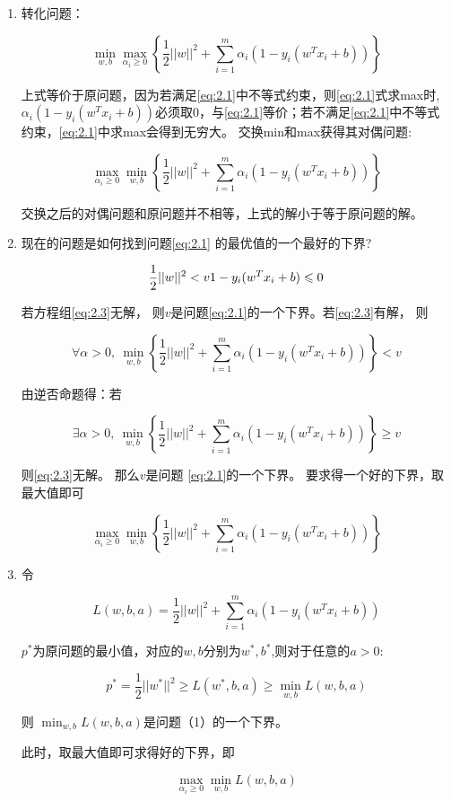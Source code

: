 \begin{enumerate}

	\item 转化问题：

\begin{equation} \label{eq:2.2}
		\min_{ w, b} \max_{\alpha_i \geqslant 0}  \left\{\frac{1}{2}|| w||^2 + \sum_{i=1}^m\alpha_i(1 - y_i( w^T x_i+b))\right\}
\end{equation}

		上式等价于原问题，因为若满足\ref{eq:2.1}中不等式约束，则\ref{eq:2.1}式求max时,$\alpha_i(1 - y_i( w^T x_i+b))$必须取0，与\ref{eq:2.1}等价；若不满足\ref{eq:2.1}中不等式约束，\ref{eq:2.1}中求max会得到无穷大。 交换min和max获得其对偶问题:

		$$
		\max_{\alpha_i \geqslant 0} \min_{ w, b}  \left\{\frac{1}{2}|| w||^2 + \sum_{i=1}^m\alpha_i(1 - y_i( w^T x_i+b))\right\}
		$$

		交换之后的对偶问题和原问题并不相等，上式的解小于等于原问题的解。

	\item 现在的问题是如何找到问题\ref{eq:2.1} 的最优值的一个最好的下界?

\begin{equation} \label{eq:2.3}
		\frac{1}{2}|| w||^2 < v\\
		1 - y_i( w^T x_i+b) \leqslant 0
\end{equation}

		若方程组\ref{eq:2.3}无解， 则$v$是问题\ref{eq:2.1}的一个下界。若\ref{eq:2.3}有解， 则

		$$
		\forall  \alpha >  0 , \ \min_{ w, b}  \left\{\frac{1}{2}|| w||^2 + \sum_{i=1}^m\alpha_i(1 - y_i( w^T x_i+b))\right\} < v
		$$

		由逆否命题得：若

		$$
		\exists  \alpha >  0 , \ \min_{ w, b}  \left\{\frac{1}{2}|| w||^2 + \sum_{i=1}^m\alpha_i(1 - y_i( w^T x_i+b))\right\} \geqslant v
		$$

		则\ref{eq:2.3}无解。 那么$v$是问题 \ref{eq:2.1}的一个下界。 要求得一个好的下界，取最大值即可

		$$
		\max_{\alpha_i \geqslant 0}  \min_{ w, b} \left\{\frac{1}{2}|| w||^2 + \sum_{i=1}^m\alpha_i(1 - y_i( w^T x_i+b))\right\}
		$$

	\item 令

		$$
		L( w, b, a) =   \frac{1}{2}|| w||^2 + \sum_{i=1}^m\alpha_i(1 - y_i( w^T x_i+b))
		$$

		$p^*$为原问题的最小值，对应的$w,b$分别为$w^*,b^*$,则对于任意的$a>0$:

		$$
		p^* = \frac{1}{2}|| w^*||^2 \geqslant  L( w^*, b, a) \geqslant \min_{ w, b} L( w, b, a)
		$$

		则 $\min_{ w, b} L( w, b, a)$是问题（1）的一个下界。

		此时，取最大值即可求得好的下界，即

		$$
		\max_{\alpha_i \geqslant 0} \min_{ w, b} L( w, b, a)
		$$
\end{enumerate}

